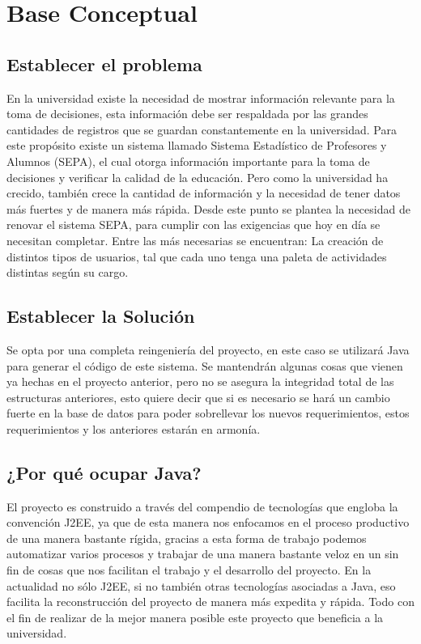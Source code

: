\documentclass[a4paper,12pt,openany,oneside]{book}
\begin{document}
\section{Base Conceptual}
\subsection{Establecer el problema}
En la universidad existe la necesidad de mostrar información relevante para la toma de decisiones, esta información debe ser respaldada por las grandes cantidades de registros que se guardan constantemente en la universidad. Para este propósito existe un sistema llamado Sistema Estadístico de Profesores y Alumnos (SEPA), el cual otorga información importante para la toma de decisiones y verificar la calidad de la educación. Pero como la universidad ha crecido, también crece la cantidad de información y la necesidad de tener datos más fuertes y de manera más rápida. Desde este punto se plantea la necesidad de renovar el sistema SEPA, para cumplir con las exigencias que hoy en día se necesitan completar. Entre las más necesarias se encuentran: La creación de distintos tipos de usuarios, tal que cada uno tenga una paleta de actividades distintas según su cargo.
\subsection{Establecer la Solución}
Se opta por una completa reingeniería del proyecto, en este caso se utilizará Java para generar el código de este sistema. Se mantendrán algunas cosas que vienen ya hechas en el proyecto anterior, pero no se asegura la integridad total de las estructuras anteriores, esto quiere decir que si es necesario se hará un cambio fuerte en la base de datos para poder sobrellevar los nuevos requerimientos, estos requerimientos y los anteriores estarán en armonía.
\subsection{¿Por qué ocupar Java?}
El proyecto es construido a través del compendio de tecnologías que engloba la convención J2EE, ya que de esta manera nos enfocamos en el proceso productivo de una manera bastante rígida, gracias a esta forma de trabajo podemos automatizar varios procesos y trabajar de una manera bastante veloz en un sin fin de cosas que nos facilitan el trabajo y el desarrollo del proyecto. En la actualidad no sólo J2EE, si no también otras tecnologías asociadas a Java, eso facilita la reconstrucción del proyecto de manera más expedita y rápida. Todo con el fin de realizar de la mejor manera posible este proyecto que beneficia a la universidad.
\end{document}

